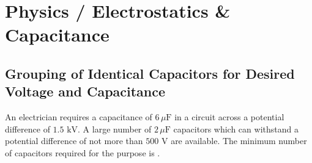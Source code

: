 \clearpage

\section{Physics / Electrostatics \& Capacitance}


\subsection{Grouping of Identical Capacitors for Desired Voltage and Capacitance}


An electrician requires a capacitance of $6\,\mu\text{F}$ in a circuit across a potential difference of $1.5\text{ kV}$. A large number of $2\,\mu\text{F}$ capacitors which can withstand a potential difference of not more than $500\text{ V}$ are available. The minimum number of capacitors required for the purpose is \underline{\hspace{2cm}}.

